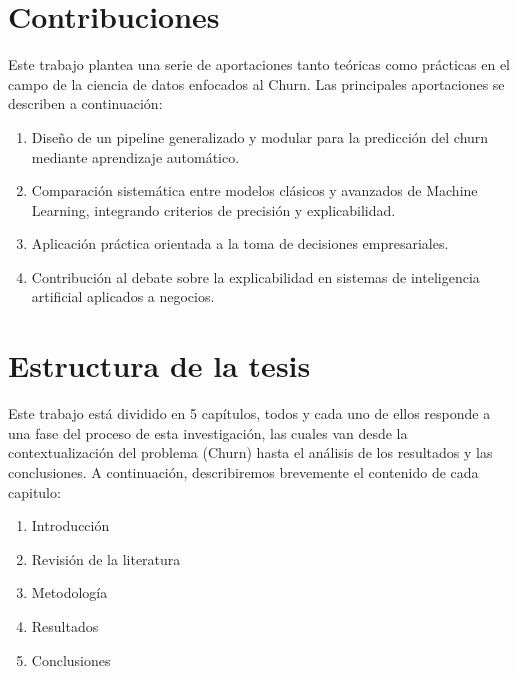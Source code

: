 
\section{Contribuciones}

Este trabajo plantea una serie de aportaciones tanto teóricas como prácticas en el campo de la ciencia de datos enfocados al Churn. Las principales aportaciones se describen a continuación:

\begin{enumerate}
	\item Diseño de un pipeline generalizado y modular para la predicción del churn mediante aprendizaje automático.
	\item Comparación sistemática entre modelos clásicos y avanzados de Machine Learning, integrando criterios de precisión y explicabilidad.
	\item Aplicación práctica orientada a la toma de decisiones empresariales.
	\item Contribución al debate sobre la explicabilidad en sistemas de inteligencia artificial aplicados a negocios.
\end{enumerate}




\section{Estructura de la tesis}

Este trabajo está dividido en 5 capítulos, todos y cada uno de ellos responde a una fase del proceso de esta investigación, las cuales van desde la contextualización del problema (Churn) hasta el análisis de los resultados y las conclusiones. A continuación, describiremos brevemente el contenido de cada capitulo:

\begin{enumerate}
	\item Introducción
	\item Revisión de la literatura
	\item Metodología
	\item Resultados
	\item Conclusiones
\end{enumerate}